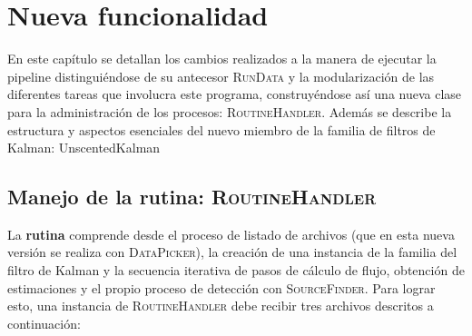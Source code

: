 \chapter{Nueva funcionalidad}
\label{ch:news}
En este cap\'itulo se detallan los cambios realizados a la  manera de ejecutar la pipeline distingui\'endose de su antecesor \textsc{RunData} y la modularizaci\'on de las diferentes tareas que involucra este programa, construy\'endose as\'i una nueva clase para la administraci\'on de los procesos: \textsc{RoutineHandler}. Adem\'as se describe la estructura y aspectos esenciales del nuevo miembro de la familia de filtros de Kalman: \textsf{UnscentedKalman}

\section{Manejo de la rutina: \textsc{RoutineHandler}}

La \textbf{rutina} comprende desde el proceso de listado de archivos (que en esta nueva versi\'on se realiza con \textsc{DataPicker}), la creaci\'on de una instancia de la familia del filtro de Kalman y la secuencia iterativa de pasos de c\'alculo de flujo, obtenci\'on de estimaciones y el propio proceso de detecci\'on con \textsc{SourceFinder}. Para lograr esto, una instancia de \textsc{RoutineHandler} debe recibir tres archivos descritos a continuaci\'on:

